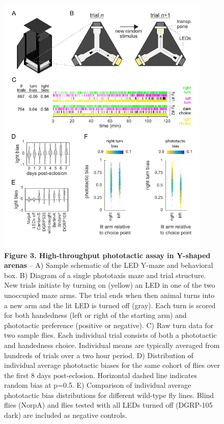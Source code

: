 \documentclass[10pt]{article}
\begin{document}
\newpage
\begin{figure}[h!]
	\begin{center}
		\includegraphics[width=0.9\textwidth]{../figures/LED_ymaze_panel.pdf}
	\end{center}
	\caption*{\footnotesize \textbf{Figure 3. High-throughput phototactic assay in Y-shaped arenas} -- A) Sample schematic of the LED Y-maze and behavioral box. B) Diagram of a single phototaxis maze and trial structure. New trials initiate by turning on (yellow) an LED in one of the two unoccupied maze arms. The trial ends when then animal turns into a new arm and the lit LED is turned off (gray). Each turn is scored for both handedness (left or right of the starting arm) and phototactic preference (positive or negative). C) Raw turn data for two sample flies. Each individual trial consists of both a phototactic and handedness choice. Individual means are typically averaged from hundreds of trials over a two hour period. D) Distribution of individual average phototactic biases for the same cohort of flies over the first 8 days post-eclosion. Horizontal dashed line indicates random bias at p=0.5. E) Comparison of individual average phototactic bias distributions for different wild-type fly lines. Blind flies (NorpA) and flies tested with all LEDs turned off (DGRP-105 dark) are included as negative controls.}
\end{figure}
\end{document}
